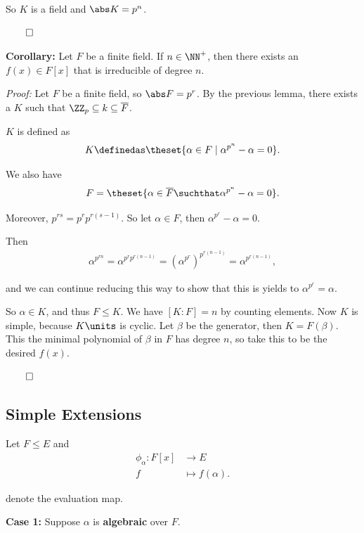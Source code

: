 So \(K\) is a field and \(\abs K = p^n\).

\(\qed\)

\textbf{Corollary:} Let \(F\) be a finite field. If \(n\in\NN^+\), then
there exists an \(f(x) \in F[x]\) that is irreducible of degree \(n\).

\emph{Proof:} Let \(F\) be a finite field, so \(\abs F = p^r\). By the
previous lemma, there exists a \(K\) such that
\(\ZZ_p \subseteq k \subseteq \overline F\).

\(K\) is defined as
\begin{align*}
K \definedas \theset{\alpha \in F \mid \alpha^{p^n} - \alpha = 0}
.\end{align*}

We also have
\begin{align*}
F  = \theset{\alpha \in \overline F \suchthat \alpha^{p^n} - \alpha = 0}.\end{align*}

Moreover, \(p^{rs} = p^r p^{r(s-1)}\). So let \(\alpha \in F\), then
\(\alpha^{p^r} - \alpha = 0\).

Then
\begin{align*}
\alpha^{p^{rn}} = \alpha^{p^r p^{r(n-1)}} = (\alpha^{p^r})^{p^{r(n-1)}} = \alpha^{p^{r(n-1)}}
,\end{align*}

and we can continue reducing this way to show that this is yields to
\(\alpha^{p^r} = \alpha\).

So \(\alpha \in K\), and thus \(F \leq K\). We have \([K:F] = n\) by
counting elements. Now \(K\) is simple, because \(K\units\) is cyclic.
Let \(\beta\) be the generator, then \(K = F(\beta)\). This the minimal
polynomial of \(\beta\) in \(F\) has degree \(n\), so take this to be
the desired \(f(x)\).

\(\qed\)

\hypertarget{simple-extensions}{%
\subsection{Simple Extensions}\label{simple-extensions}}

Let \(F \leq E\) and \begin{align*}
\phi_\alpha: F[x] &\to E \\
f &\mapsto f(\alpha)
.\end{align*}

denote the evaluation map.

\textbf{Case 1:} Suppose \(\alpha\) is \textbf{algebraic} over \(F\).

